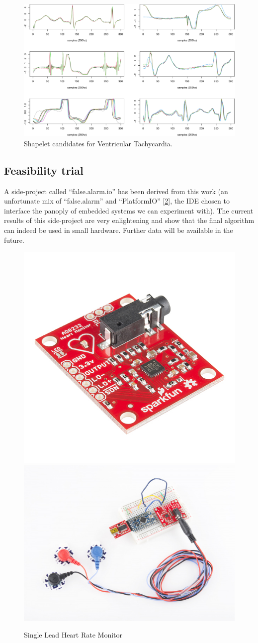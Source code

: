\documentclass[runningheads]{llncs}
\begin{document}
\begin{figure}

{\centering \includegraphics[width=0.9\linewidth]{epia2022_files/figure-latex/vtachy-1} 

}

\caption{Shapelet candidates for Ventricular Tachycardia.}\label{fig:vtachy}
\end{figure}

\hypertarget{feasibility-trial}{%
\subsection{Feasibility trial}\label{feasibility-trial}}

A side-project called ``false.alarm.io'' has been derived from this work (an unfortunate mix of
``false.alarm'' and ``PlatformIO'' {[}\protect\hyperlink{ref-PlatformIO}{2}{]}, the IDE chosen to interface the panoply of embedded
systems we can experiment with). The current results of this side-project are very enlightening and
show that the final algorithm can indeed be used in small hardware. Further data will be available
in the future.

\begin{figure}

{\centering \includegraphics[width=0.4\linewidth]{../../docs/figure/sparkfun} \includegraphics[width=0.4\linewidth]{../../docs/figure/FullSetup} 

}

\caption{Single Lead Heart Rate Monitor}\label{fig:ad8232}
\end{figure}
\end{document}
